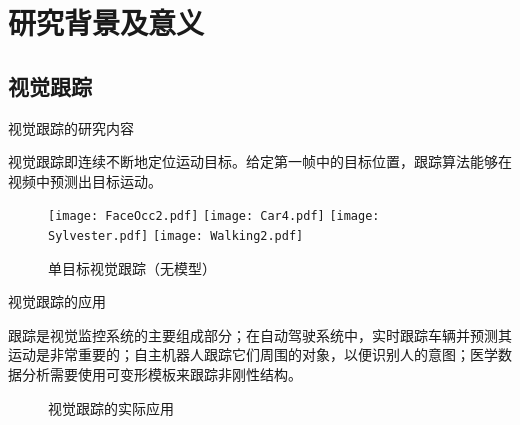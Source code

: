 \section{研究背景及意义}

\subsection{视觉跟踪}

\begin{frame}{视觉跟踪的研究内容}

\begin{block}{}
    视觉跟踪即连续不断地定位运动目标。给定第一帧中的目标位置，跟踪算法能够在视频中预测出目标运动。
\end{block}
\begin{figure}[htp]
\texttt{[image: FaceOcc2.pdf]}
\texttt{[image: Car4.pdf]}
\texttt{[image: Sylvester.pdf]}
\texttt{[image: Walking2.pdf]}
\caption{单目标视觉跟踪（无模型）}
\end{figure}
\end{frame}


\begin{frame}{视觉跟踪的应用}
    \begin{block}{}
跟踪是视觉监控系统的主要组成部分；在自动驾驶系统中，实时跟踪车辆并预测其运动是非常重要的；自主机器人跟踪它们周围的对象，以便识别人的意图；医学数据分析需要使用可变形模板来跟踪非刚性结构。
\end{block}
\begin{figure}[htp]
\caption{视觉跟踪的实际应用}
\label{fig:gen_applications}
\end{figure}
\end{frame}



